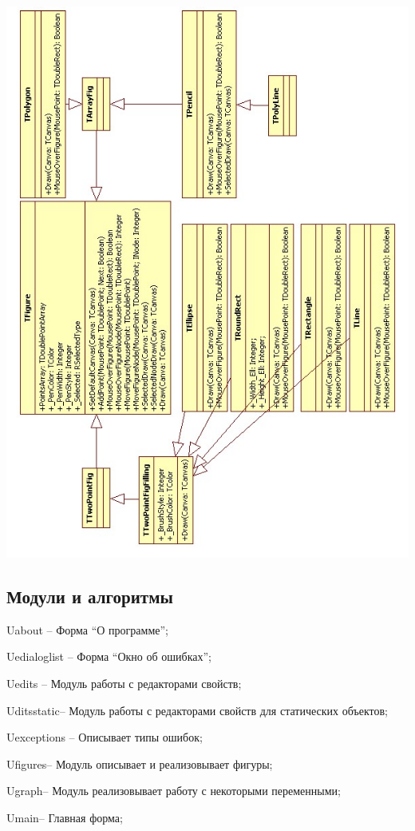 \documentclass[a4paper,12pt]{article}
\begin{document}
\includegraphics*[scale = 0.60]{image2.jpg}


\subsection{Модули и алгоритмы}

Uabout -- Форма ``О программе'';

Uedialoglist -- Форма ``Окно об ошибках'';

Uedits -- Модуль работы с редакторами свойств;

Uditsstatic-- Модуль работы с редакторами свойств для статических объектов;

Uexceptions -- Описывает типы ошибок;

Ufigures-- Модуль описывает и реализовывает фигуры;

Ugraph-- Модуль реализовывает работу с некоторыми переменными;

Umain-- Главная форма;
\end{document}
